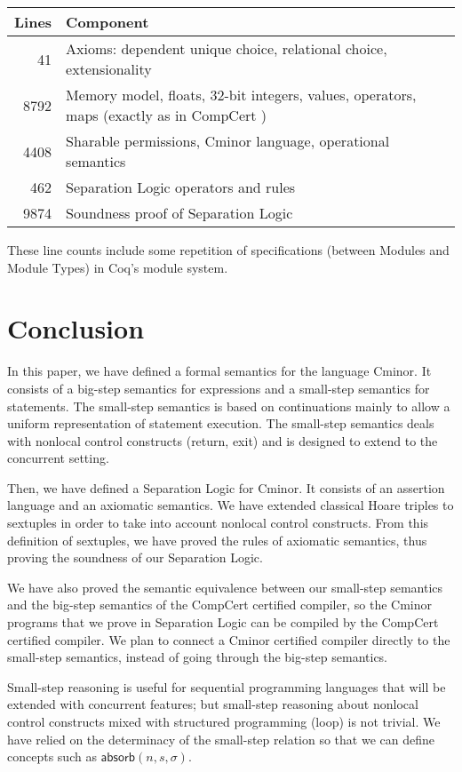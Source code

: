 \documentclass{llncs}
\newcommand{\cminor}{Cminor}
\newcommand{\compcert}{CompCert}
\newcommand{\tyface}[1]{\ensuremath{\mathsf{#1}}}
\newcommand{\st}{\sigma}
\newcommand{\absorb}[3]{\tyface{absorb}(#1,#2,#3)}
\begin{document}
\begin{tabular}{r@{\quad} p{4.1in}}
Lines & Component\\ \hline
41 & Axioms: dependent unique choice, relational choice,
extensionality \\
8792 & Memory model, floats, 32-bit integers, values, operators, maps 
(exactly as in CompCert \cite{leroy06}) \\
4408 & Sharable permissions, \cminor{} language, operational semantics \\
462 & Separation Logic operators and rules\\
9874 & Soundness proof of Separation Logic
\end{tabular}

\noindent These line counts include some repetition of specifications (between Modules
and Module Types) in Coq's module system.
\vspace{-8pt}

\section{Conclusion}
In this paper, we have defined a formal semantics for the language \cminor. It consists of
a big-step semantics for expressions and a small-step semantics for statements.
The small-step semantics is based on continuations mainly to allow a uniform
representation of statement execution.
The small-step semantics deals with nonlocal control constructs (return, exit)
and is designed to extend to the concurrent setting.

Then, we have defined a Separation Logic for \cminor. It consists of an assertion language
and an axiomatic semantics.
We have extended classical Hoare triples to sextuples in order to take into account
nonlocal control constructs.
From this definition of sextuples, we have proved the rules of axiomatic semantics,
thus proving the soundness of our Separation Logic.

We have also  proved the semantic equivalence between our
small-step semantics and the big-step semantics of the \compcert{} certified compiler,
so the \cminor{} programs that we prove in Separation Logic can be compiled by the
\compcert{} certified compiler.
We plan to connect 
a \cminor{} certified compiler directly to the small-step semantics, instead
of going through the big-step semantics.  

Small-step reasoning is useful for sequential programming languages
that will be extended with concurrent features;
but small-step reasoning about 
nonlocal control constructs
mixed with structured programming (loop) is not trivial.
We have relied on
the determinacy of the small-step relation so that we
can define concepts such as $\absorb{n}{s}{\st}$.




\end{document}
